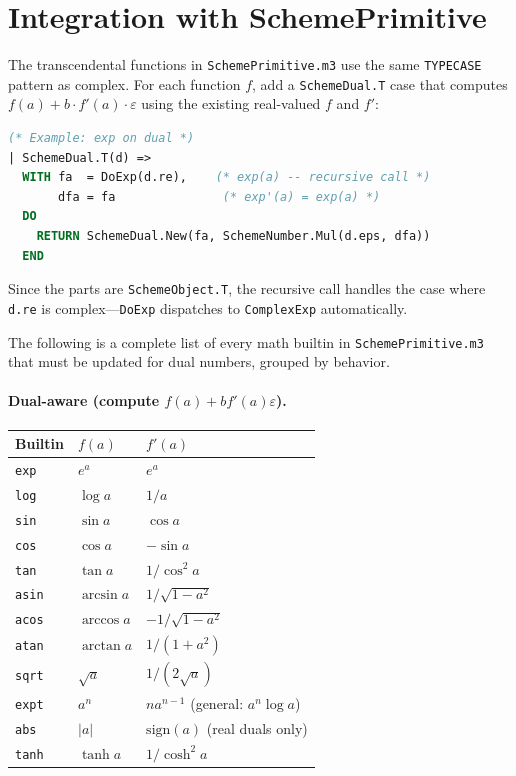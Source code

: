 \documentclass[12pt]{report}
\begin{document}
\section{Integration with SchemePrimitive}

The transcendental functions in {\tt SchemePrimitive.m3} use the
same {\tt TYPECASE} pattern as complex.  For each function $f$,
add a {\tt SchemeDual.T} case that computes
$f(a) + b \cdot f'(a) \cdot \varepsilon$ using the existing
real-valued $f$ and $f'$:

\begin{lstlisting}[language=Modula3]
(* Example: exp on dual *)
| SchemeDual.T(d) =>
  WITH fa  = DoExp(d.re),    (* exp(a) -- recursive call *)
       dfa = fa               (* exp'(a) = exp(a) *)
  DO
    RETURN SchemeDual.New(fa, SchemeNumber.Mul(d.eps, dfa))
  END
\end{lstlisting}

\noindent Since the parts are {\tt SchemeObject.T}, the recursive
call handles the case where {\tt d.re} is complex---{\tt DoExp}
dispatches to {\tt ComplexExp} automatically.

The following is a complete list of every math builtin in
{\tt SchemePrimitive.m3} that must be updated for dual numbers,
grouped by behavior.

\paragraph{Dual-aware (compute $f(a) + b f'(a) \varepsilon$).}

\begin{center}
\small
\begin{tabular}{lll}
\toprule
Builtin & $f(a)$ & $f'(a)$ \\
\midrule
{\tt exp}   & $e^a$          & $e^a$ \\
{\tt log}   & $\log a$       & $1/a$ \\
{\tt sin}   & $\sin a$       & $\cos a$ \\
{\tt cos}   & $\cos a$       & $-\sin a$ \\
{\tt tan}   & $\tan a$       & $1/\cos^2 a$ \\
{\tt asin}  & $\arcsin a$    & $1/\sqrt{1-a^2}$ \\
{\tt acos}  & $\arccos a$    & $-1/\sqrt{1-a^2}$ \\
{\tt atan}  & $\arctan a$    & $1/(1+a^2)$ \\
{\tt sqrt}  & $\sqrt{a}$     & $1/(2\sqrt{a})$ \\
{\tt expt}  & $a^n$          & $n a^{n-1}$ (general: $a^n \log a$) \\
{\tt abs}   & $|a|$          & $\mathrm{sign}(a)$ (real duals only) \\
{\tt tanh}  & $\tanh a$      & $1/\cosh^2 a$ \\
\bottomrule
\end{tabular}
\end{center}
\end{document}
